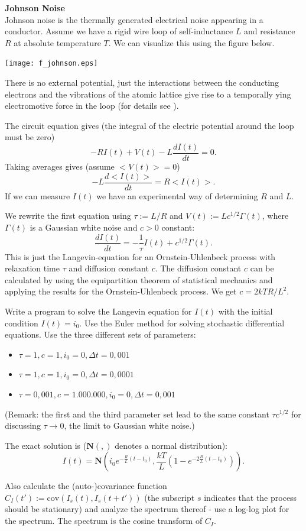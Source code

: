 \begin{Ex}
\label{Johnson_Noise}
\textbf{Johnson Noise \cite[]{gillespie:96} } \\
Johnson noise is the thermally generated electrical noise appearing in a conductor. 
Assume we have a rigid wire loop of self-inductance $L$ and resistance $R$ at
absolute temperature $T$. We can visualize this using the figure below. 
\begin{center}
\texttt{[image: f\_johnson.eps]}
\end{center}
There is no external potential, just the interactions between the conducting
electrons and the vibrations of the atomic lattice give rise to a temporally ying
electromotive force in the loop (for details see \cite[]{gillespie:96}). 

The circuit equation gives (the integral of the electric potential around the 
loop must be zero)
$$ -RI(t)+V(t)-L\frac{dI(t)}{dt}=0.$$
Taking averages gives (assume $<V(t)>=0$) $$ -L\frac{d<I(t)>}{dt} =R<I(t)> .$$
If we can measure $I(t)$ we have an experimental way of determining $R$ and $L$.

We rewrite the first equation using $\tau:=L/R$ and $V(t):=Lc^{1/2}\Gamma(t)$, where
$\Gamma(t)$ is a Gaussian white noise and $c>0$ constant:
$$ \frac{dI(t)}{dt}=-\frac{1}{\tau}I(t)+c^{1/2}\Gamma(t) .$$
This is just the Langevin-equation for an Ornstein-Uhlenbeck process with
relaxation time $\tau$ and diffusion constant $c.$
The diffusion constant $c$ can be calculated by using the equipartition
theorem of statistical mechanics and applying the results for the 
Ornstein-Uhlenbeck process. We get $c=2kTR/L^2.$

Write a program to solve the Langevin equation for $I(t)$ with the initial
condition $I(t)=i_0.$ Use the Euler method for solving stochastic
differential equations. Use the three different sets of parameters:
\begin{itemize}
\item $\tau=1, c=1, i_0=0, \Delta t=0,001 $
\item $\tau=1, c=1, i_0=0, \Delta t=0,0001 $
\item $\tau=0,001, c=1.000.000, i_0=0, \Delta t=0,001 $
\end{itemize}
(Remark: the first and the third parameter set lead to the same
constant $\tau c^{1/2}$ for discussing $\tau\to 0$, the limit to Gaussian
white noise.)

The exact solution is ($\mathbf{N}( , )$ denotes a normal distribution):
$$ I(t)= \mathbf{N}\left(i_0e^{- \frac{R}{L}(t-t_0)} , \frac{kT}{L}
        \left(1-e^{-2\frac{R}{L}(t-t_0)}\right) \right) .$$

Also calculate the (auto-)covariance function $ C_I(t'):=\text{cov}(I_s(t),I_s(t+t')) $
(the subscript $s$ indicates that the process should be stationary)
and analyze the spectrum thereof - use a log-log plot for the
spectrum. The spectrum is the cosine transform of $C_I$.
\end{Ex}







